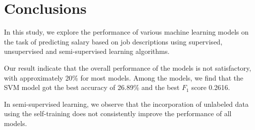 \documentclass[11pt]{article}
\begin{document}
\section{Conclusions}

In this study, we explore the performance of various machine learning models on the task of predicting salary based on job descriptions using
supervised, unsupervised and semi-supervised learning algorithms.

Our result indicate that the overall performance of the models is not satisfactory,
with approximately 20\% for most models.
Among the models, we find that the SVM model got the best accuracy of 26.89\% and the best $F_1$ score 0.2616.

In semi-supervised learning, we observe that the incorporation of unlabeled data using the self-training does not consistently improve the performance of all models.










\nocite{*}


\end{document}
